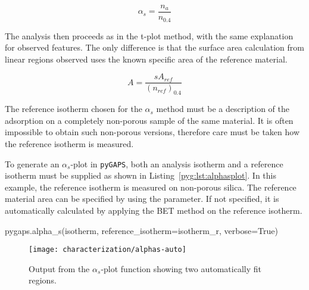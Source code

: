 \begin{equation}
	\alpha_s = \frac{n_a}{n_{0.4}}
\end{equation}

The analysis then proceeds as in the t-plot method, with the 
same explanation for observed features. The only difference is
that the surface area calculation from linear regions observed
uses the known specific area of the reference material.

\begin{equation}
	A = \frac{s A_{ref}}{(n_{ref})_{0.4}}
\end{equation}

The reference isotherm chosen for the \(\alpha_s\) method must 
be a description of the adsorption on a completely non-porous sample
of the same material. It is often impossible to obtain such 
non-porous versions, therefore care must be
taken how the reference isotherm is measured.

To generate an \(\alpha_s\)-plot in \texttt{pyGAPS}, both 
an analysis isotherm and a reference isotherm must be supplied 
as shown in Listing~\ref{pyg:lst:alphasplot}.
In this example, the reference isotherm is measured on non-porous silica.
The reference material area can be specified by using 
the  parameter. If not specified, it 
is automatically calculated by applying the BET
method on the reference isotherm.

\begin{python}[caption={Generating an \(\alpha_s\)-plot},label={pyg:lst:alphasplot}]
pygaps.alpha_s(isotherm, 
			   reference_isotherm=isotherm_r,
			   verbose=True)
\end{python}

\begin{figure}[!htb]
	\centering

	\texttt{[image: characterization/alphas-auto]}
	\caption{Output from the \(\alpha_s\)-plot function showing two
		automatically fit regions.}%
	\label{pyg:fgr:alphasplot}

\end{figure}
